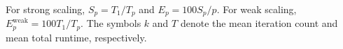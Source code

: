 \begin{table}[htbp]
    \vspace{2mm}
    \begin{minipage}{0.97\linewidth}
        \footnotesize
        For strong scaling, $S_p=T_1/T_p$ and $E_p=100S_p/p$. For weak scaling, $E^{\mathrm{weak}}_p=100T_1/T_p$. The symbols $k$ and $T$ denote the mean iteration count and mean total runtime, respectively.
    \end{minipage}
\end{table}
